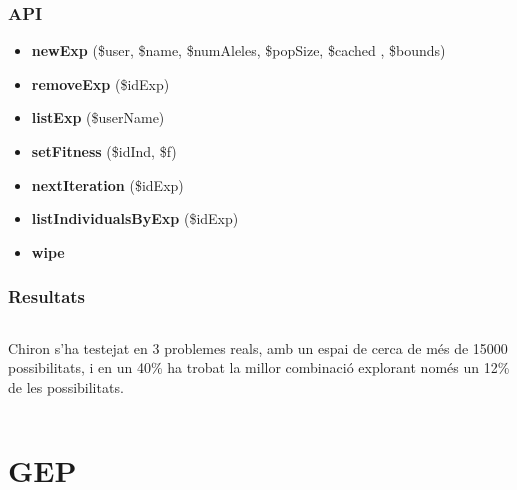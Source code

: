 \documentclass{beamer}
\begin{document}
\begin{frame}
	\frametitle{API}
	\begin{itemize}
		\item \textbf{newExp} (\$user, \$name, \$numAleles, \$popSize, \$cached , \$bounds)
		\item \textbf{removeExp} (\$idExp)
		\item \textbf{listExp} (\$userName)
		\item \textbf{setFitness} (\$idInd, \$f)
		\item \textbf{nextIteration} (\$idExp)
		\item \textbf{listIndividualsByExp} (\$idExp)
		\item \textbf{wipe}
	\end{itemize}
\end{frame}

\begin{frame}
	\frametitle{Resultats}
	\begin{columns}[c]
		Chiron s'ha testejat en 3 problemes reals, amb un espai de cerca de més de 15000
		possibilitats, i en un 40\% ha trobat la millor combinació explorant només un
		12\% de les possibilitats.
	\end{columns}
\end{frame}

\section{GEP} %
\label{sec:GEP}
\end{document}
